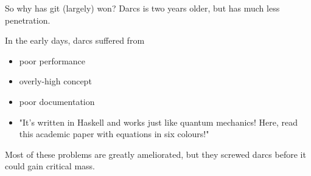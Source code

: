 \documentclass[pdf]{prosper}
\begin{document}



\begin{slide}{So why has git (largely) won?}
Darcs is two years older, but has much less penetration.

In the early days, darcs suffered from
\begin{itemize}
\item poor performance
\item overly-high concept
\item poor documentation
\item "It's written in Haskell and works just like quantum mechanics! Here,
read this academic paper with equations in six colours!"
\end{itemize}
Most of these problems are greatly ameliorated, but they screwed darcs before
it could gain critical mass.
\end{slide}
\end{document}
